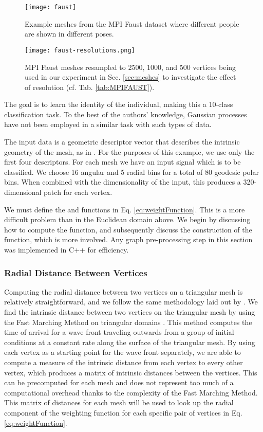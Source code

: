 \documentclass{article}
\begin{document}
\begin{figure}
\centering
\texttt{[image: faust]}
\caption{Example meshes from the MPI Faust dataset where different people are shown in different poses.}
\end{figure}

\begin{figure}[t]
\centering
\texttt{[image: faust-resolutions.png]}
\caption{MPI Faust meshes resampled to 2500, 1000, and 500 vertices being used in our experiment in Sec. \ref{sec:meshes} to investigate the effect of resolution (cf. Tab. \ref{tab:MPIFAUST}).}
\end{figure}

The goal is to learn the identity of the individual, making this a 10-class classification task. To the best of the authors' knowledge, Gaussian processes have not been employed in a similar task with such types of data.

The input data is a geometric descriptor vector that describes the intrinsic geometry of the mesh, as in \citet{descriptors}. For the purposes of this example, we use only the first four descriptors. For each mesh we have an input signal  which is to be classified. We choose 16 angular and 5 radial bins for a total of 80 geodesic polar bins. When combined with the dimensionality of the input, this produces a 320-dimensional patch for each vertex.

We must define the  and  functions in Eq. \eqref{eq:weightFunction}. This is a more difficult problem than in the Euclidean domain above. We begin by discussing how to compute the  function, and subsequently discuss the construction of the  function, which is more involved. Any graph pre-processing step in this section was implemented in C++ for efficiency. 

\subsubsection{Radial Distance Between Vertices}

Computing the radial distance between two vertices on a triangular mesh is relatively straightforward, and we follow the same methodology laid out by \citet{graphNN}. We find the intrinsic distance between two vertices on the triangular mesh by using the Fast Marching Method on triangular domains \citep{fmm,fmmGeo}. This method computes the time of arrival for a wave front traveling outwards from a group of initial conditions at a constant rate along the surface of the triangular mesh. By using each vertex as a starting point for the wave front separately, we are able to compute a measure of the intrinsic distance from each vertex to every other vertex, which produces a  matrix of intrinsic distances between the vertices. This can be precomputed for each mesh and does not represent too much of a computational overhead thanks to the  complexity of the Fast Marching Method. This matrix of distances for each mesh will be used to look up the radial component of the weighting function for each specific pair of vertices in Eq. \eqref{eq:weightFunction}.
\end{document}

